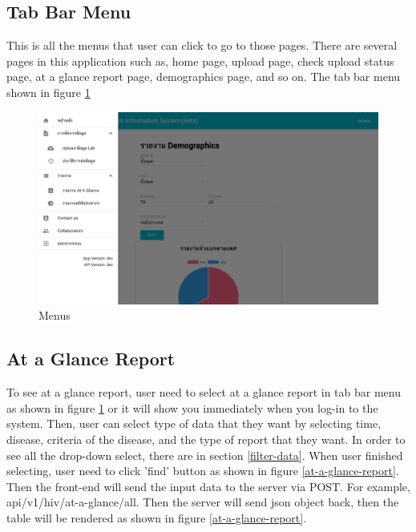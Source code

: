 	
	\subsection{Tab Bar Menu}
	
	This is all the menus that user can click to go to those pages. There are several pages in this application such as, home page, upload page, check upload status page, at a glance report page, demographics page, and so on. The tab bar menu shown in figure \ref{tab-bar-menu}
	
	\FloatBarrier
    	\begin{figure}[h!]
            \centering
        		\includegraphics[width=12cm]{images/chapter-05/tab-bar-menu.png}
        		\caption{Menus}
        		\label{tab-bar-menu}
        \end{figure}
	\FloatBarrier
	
	\subsection{At a Glance Report}
	
	To see at a glance report, user need to select at a glance report in tab bar menu as shown in figure \ref{tab-bar-menu} or it will show you immediately when you log-in to the system. Then, user can select type of data that they want by selecting time, disease, criteria of the disease, and the type of report that they want. In order to see all the drop-down select, there are in section \ref{filter-data}. When user finished selecting, user need to click 'find' button as shown in figure \ref{at-a-glance-report}. Then the front-end will send the input data to the server via POST. For example, api/v1/hiv/at-a-glance/all. Then the server will send json object back, then the table will be rendered as shown in figure \ref{at-a-glance-report}. 
	
